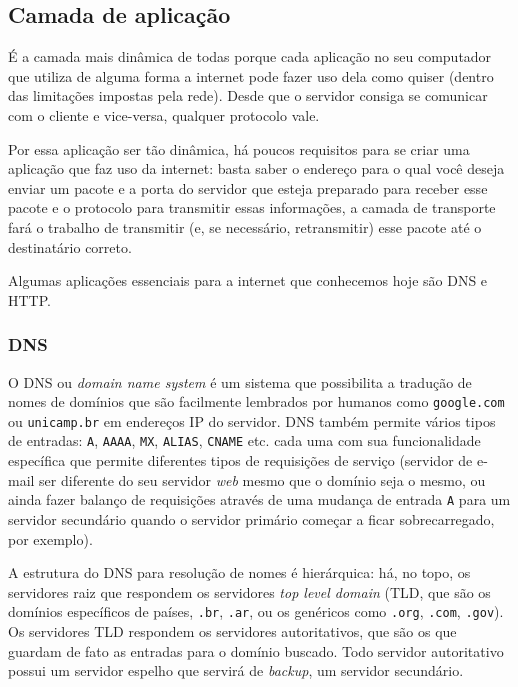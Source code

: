 \documentclass[brazilian,a4paper,twocolumn]{article}
\begin{document}
\subsection{Camada de aplicação}

É a camada mais dinâmica de todas porque cada aplicação no seu computador que utiliza de alguma forma a internet pode fazer uso dela como quiser (dentro das limitações impostas pela rede). Desde que o servidor consiga se comunicar com o cliente e vice-versa, qualquer protocolo vale.

Por essa aplicação ser tão dinâmica, há poucos requisitos para se criar uma aplicação que faz uso da internet: basta saber o endereço para o qual você deseja enviar um pacote e a porta do servidor que esteja preparado para receber esse pacote e o protocolo para transmitir essas informações, a camada de transporte fará o trabalho de transmitir (e, se necessário, retransmitir) esse pacote até o destinatário correto.

Algumas aplicações essenciais para a internet que conhecemos hoje são DNS e HTTP.

\subsubsection{DNS}

O DNS ou \textit{domain name system} é um sistema que possibilita a tradução de nomes de domínios que são facilmente lembrados por humanos como \texttt{google.com} ou \texttt{unicamp.br} em endereços IP do servidor. DNS também permite vários tipos de entradas: \texttt{A}, \texttt{AAAA}, \texttt{MX}, \texttt{ALIAS}, \texttt{CNAME} etc. cada uma com sua funcionalidade específica que permite diferentes tipos de requisições de serviço (servidor de e-mail ser diferente do seu servidor \textit{web} mesmo que o domínio seja o mesmo, ou ainda fazer balanço de requisições através de uma mudança de entrada \texttt{A} para um servidor secundário quando o servidor primário começar a ficar sobrecarregado, por exemplo).

A estrutura do DNS para resolução de nomes é hierárquica: há, no topo, os servidores raiz que respondem os servidores \textit{top level domain} (TLD, que são os domínios específicos de países, \texttt{.br}, \texttt{.ar}, ou os genéricos como \texttt{.org}, \texttt{.com}, \texttt{.gov}). Os servidores TLD respondem os servidores autoritativos, que são os que guardam de fato as entradas para o domínio buscado. Todo servidor autoritativo possui um servidor espelho que servirá de \textit{backup}, um servidor secundário.
\end{document}
